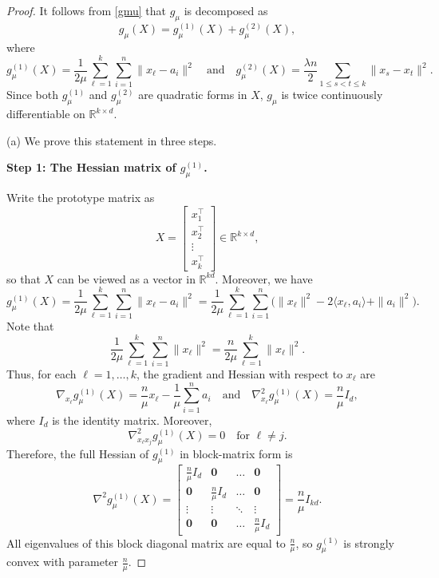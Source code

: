\documentclass[11pt]{article}
\theoremstyle{definition}
\newcommand{\R}{\mathbb{R}}
\newcommand{\1}{\mathbf{1}}
\begin{document}
\begin{proof}
It follows from \eqref{gmu} that $g_\mu$ is decomposed as
\[
g_\mu(X) = g_\mu^{(1)}(X) + g_\mu^{(2)}(X),
\]
where
\begin{equation*}
g_\mu^{(1)}(X) = \frac{1}{2\mu} \sum_{\ell=1}^k \sum_{i=1}^n \|x_\ell - a_i\|^2
\quad\text{and}\quad 
g_\mu^{(2)}(X) = \frac{\lambda n}{2} \sum_{1 \le s < t \le k} \|x_s - x_t\|^2.
\end{equation*}
Since both $g_\mu^{(1)}$ and $g_\mu^{(2)}$ are quadratic forms in $X$,  $g_\mu$ is twice continuously differentiable on $\mathbb{R}^{k \times d}$. 


\noindent(a) We prove this statement in three steps.

\medskip
\noindent\textbf{Step 1: The Hessian matrix of $g_\mu^{(1)}$.}

Write the prototype matrix as
\[
X =
\begin{bmatrix}
x_1^\top  \\
 x_2^\top  \\
 \vdots  \\
 x_k^\top 
\end{bmatrix}
\in \R^{k\times d},
\]
so that $X$ can be viewed as a vector in $\R^{kd}$. Moreover, we have
\[
g_\mu^{(1)}(X)
= \frac{1}{2\mu} \sum_{\ell=1}^k \sum_{i=1}^n \|x_\ell - a_i\|^2
= \frac{1}{2\mu} \sum_{\ell=1}^k \sum_{i=1}^n \big(\|x_\ell\|^2 - 2\langle x_\ell, a_i\rangle + \|a_i\|^2\big).
\]
Note that
\[
\frac{1}{2\mu}\sum_{\ell=1}^k \sum_{i=1}^n \|x_\ell\|^2 = \frac{n}{2\mu}\sum_{\ell=1}^k \|x_\ell\|^2.
\]
Thus, for each $\ell = 1,\dots,k$, the gradient and Hessian with respect to $x_\ell$ are
\[
\nabla_{x_\ell} g_\mu^{(1)}(X) = \frac{n}{\mu} x_\ell - \frac{1}{\mu} \sum_{i=1}^n a_i
\quad\text{and}\quad
\nabla_{x_\ell}^2 g_\mu^{(1)}(X) = \frac{n}{\mu} I_d,
\]
where $I_d$ is the identity matrix. 
Moreover, 
\[
\nabla_{x_\ell x_j}^2 g_\mu^{(1)}(X) = 0 \quad \text{for } \ell \neq j.
\]
Therefore, the full Hessian of $g_\mu^{(1)}$ in block-matrix form is
\begin{equation}\label{hessian1}
\nabla^2 g_\mu^{(1)}(X)
=
\begin{bmatrix}
\frac{n}{\mu} I_d & \mathbf{0} & \dots & \mathbf{0} \\
\mathbf{0} & \frac{n}{\mu} I_d & \dots & \mathbf{0} \\
\vdots & \vdots & \ddots & \vdots \\
\mathbf{0} & \mathbf{0} & \dots & \frac{n}{\mu} I_d
\end{bmatrix}
= \frac{n}{\mu} I_{kd}.    
\end{equation}
All eigenvalues of this block diagonal matrix are equal to $\frac{n}{\mu}$, so $g_\mu^{(1)}$ is strongly convex with parameter $\frac{n}{\mu}$.


\end{proof}
\end{document}
